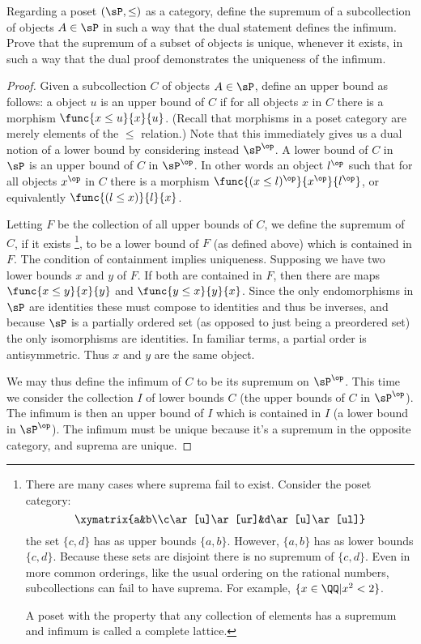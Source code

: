 \documentclass[main.tex]{subfiles}
\begin{document}
\begin{exercise}
	Regarding a poset \((\sP,\le)\) as a category, define the supremum of a
	subcollection of objects \(A\in\sP\) in such a way that the dual
	statement defines the infimum. Prove that the supremum of a subset of
	objects is unique, whenever it exists, in such a way that the dual proof
	demonstrates the uniqueness of the infimum.
\end{exercise}
\begin{proof}
	Given a subcollection \(C\) of objects \(A\in\sP\), define an upper bound
	as follows: a object \(u\) is an upper bound of \(C\) if for all objects
	\(x\) in \(C\) there is a morphism \(\func{x\le u}{x}{u}\). (Recall that
	morphisms in a poset category are merely elements of the \(\le\) relation.)
	Note that this immediately gives us a dual notion of a lower bound by
	considering instead \(\sP^\op\). A lower bound of \(C\) in \(\sP\) is an
	upper bound of \(C\) in \(\sP^\op\). In other words an object \(l^\op\) such
	that for all objects \(x^\op\) in \(C\) there is a morphism \(\func{(x\le
	l)^\op}{x^\op}{l^\op}\), or equivalently \(\func{(l\le x)}{l}{x}\).

	Letting \(F\) be the collection of all upper bounds of \(C\), we define the
	supremum of \(C\), if it exists%
	\footnote{There are many cases where suprema fail to exist. Consider
		the poset category: \[\xymatrix{a&b\\c\ar[u]\ar[ur]&d\ar[u]\ar[ul]}\]
		the set \(\{c,d\}\) has as upper bounds \(\{a,b\}\). However,
		\(\{a,b\}\) has as lower bounds \(\{c,d\}\). Because these sets are
		disjoint there is no supremum of \(\{c,d\}\). Even in more common
		orderings, like the usual ordering on the rational numbers,
		subcollections can fail to have suprema. For example,
		\(\{x\in\QQ|x^2<2\}\).

		A poset with the property that any collection of elements has a supremum
		and infimum is called a complete lattice.
	}, to be a lower bound of \(F\) (as defined
	above) which is contained in \(F\). The condition of containment implies
	uniqueness. Supposing we have two lower bounds \(x\) and \(y\) of \(F\). If
	both are contained in \(F\), then there are maps \(\func{x\le y}{x}{y}\) and
	\(\func{y\le x}{y}{x}\). Since the only endomorphisms in \(\sP\) are
	identities these must compose to identities and thus be inverses, and
	because \(\sP\) is a partially ordered set (as opposed to just being a
	preordered set) the only isomorphisms are identities. In familiar terms, a
	partial order is antisymmetric. Thus \(x\) and \(y\) are the same object.

	We may thus define the infimum of \(C\) to be its supremum on \(\sP^\op\).
	This time we consider the collection \(I\) of lower bounds \(C\) (the upper
	bounds of \(C\) in \(\sP^\op\)). The infimum is then an upper bound of \(I\)
	which is contained in \(I\) (a lower bound in \(\sP^\op\)). The infimum must
	be unique because it's a supremum in the opposite category, and suprema are
	unique.
\end{proof}
\end{document}
